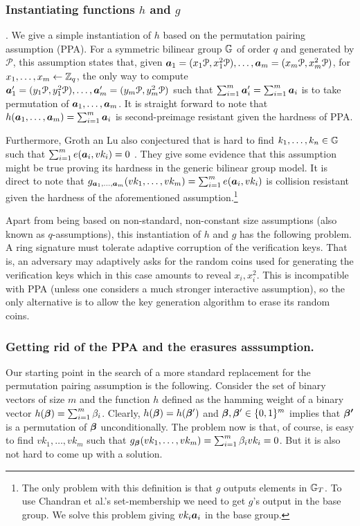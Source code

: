 
\subsubsection{Instantiating functions $h$ and $g$}. We give a simple instantiation of $h$ based on the permutation pairing assumption (PPA). For a symmetric bilinear group $\mathbb{G}$ of order $q$ and generated by $\mathcal{P}$, this assumption states that, given ${\boldsymbol{a}}_1 = (x_1\mathcal{P},x_1^2\mathcal{P}),\ldots,{\boldsymbol{a}}_m=(x_m\mathcal{P},x^2_m\mathcal{P})$, for $x_1,\ldots,x_m\gets\mathbb{Z}_q$, the only way to compute ${\boldsymbol{a}}'_1=(y_1\mathcal{P},y_1^2\mathcal{P}),\ldots,{\boldsymbol{a}}'_m=(y_m\mathcal{P},y_m^2\mathcal{P})$ such that $\sum_{i=1}^m {\boldsymbol{a}}'_i = \sum_{i=1}^m{\boldsymbol{a}}_i$ is to take permutation of ${\boldsymbol{a}}_1,\ldots,{\boldsymbol{a}}_m$.  It is straight forward to note that $h({\boldsymbol{a}}_1,\ldots,{\boldsymbol{a}}_m) = \sum_{i=1}^m {\boldsymbol{a}}_i$ is second-preimage resistant given the hardness of PPA.

Furthermore, Groth an Lu also conjectured that is hard to find $k_1,\ldots,k_n\in\mathbb{G}$ such that $\sum_{i=1}^m e({\boldsymbol{a}}_i,vk_i)=0$ \cite{AC:GroLu07}. They give some evidence that this assumption might be true proving its hardness in the generic bilinear group model. It is direct to note that $g_{{\boldsymbol{a}}_1,\ldots,{\boldsymbol{a}}_m}(vk_1,\ldots,vk_m) = \sum_{i=1}^m e({\boldsymbol{a}}_i,vk_i)$ is collision resistant given the hardness of the aforementioned assumption.\footnote{The only problem with this definition is that $g$ outputs elements in $\mathbb{G}_T$. To use Chandran et al.'s set-membership we need to get $g$'s output  in the base group. We solve this problem giving $vk_i{\boldsymbol{a}}_i$ in the base group.}

Apart from being based on non-standard, non-constant size assumptions (also known as $q$-assumptions), this instantiation of $h$ and $g$ has the following problem. A ring signature must tolerate adaptive corruption of the verification keys. That is, an adversary may adaptively asks for the random coins used for generating the verification keys which in this case amounts to reveal $x_i,x_i^2$. This is incompatible with PPA (unless one considers a much stronger interactive assumption), so the only alternative is to allow the key generation algorithm to erase its random coins.

\subsubsection{Getting rid of the PPA and the erasures asssumption.} Our starting point in the search of a more standard replacement for the permutation pairing assumption is the following. Consider the set of binary vectors of size $m$ and the function $h$ defined as the hamming weight of a binary vector $h({\boldsymbol{\beta}}) = \sum_{i=1}^m \beta_i$. Clearly, $h({\boldsymbol{\beta}})=h({\boldsymbol{\beta}}')$ and ${\boldsymbol{\beta}},{\boldsymbol{\beta}}'\in\{0,1\}^m$ implies that ${\boldsymbol{\beta'}}$ is a permutation of ${\boldsymbol{\beta}}$ unconditionally.
The problem now is that, of course, is easy to find $vk_1,\ldots,{vk}_m$ such that $g_{\boldsymbol{\beta}}(vk_1,\ldots,vk_m) = \sum_{i=1}^m \beta_i vk_i = 0$. But it is also not hard to come up with a solution.

